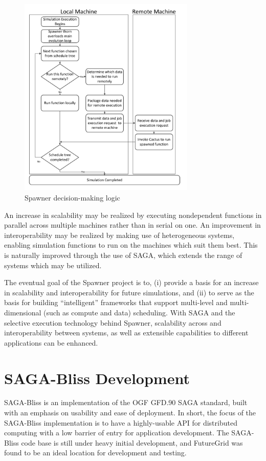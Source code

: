 \documentclass[]{paper}
\begin{document}
\begin{figure}[t]
	\centering
		\includegraphics[width=0.75\textwidth]{figures/spawner-logic.pdf}
\caption{Spawner decision-making logic}
\label{fig:spawner}
\end{figure}		

An increase in scalability may be realized by executing nondependent functions in parallel across multiple machines rather than in serial on one.  An improvement in interoperability may be realized by making use of heterogeneous systems, enabling simulation functions to run on the machines which suit them best.  This is naturally improved through the use of SAGA, which extends the range of systems which may be utilized.

The eventual goal of the Spawner project is to, (i) provide a basis for an increase in scalability and interoperability for future simulations, and (ii) to serve as the basis for building ``intelligent'' frameworks that support multi-level and multi-dimensional (such as compute and data) scheduling.  With SAGA and the selective execution technology behind Spawner, scalability across and interoperability between systems, as well as extensible capabilities to different applications can be enhanced.

\section{SAGA-Bliss Development} SAGA-Bliss is an implementation of the OGF GFD.90 SAGA standard, built with an emphasis on usability and ease of deployment.  %
In short, the focus of the SAGA-Bliss implementation is to have a highly-usable API for distributed computing with a low barrier of entry for application development. The SAGA-Bliss code base is still under heavy initial development, and FutureGrid was found to be an ideal location for development and testing.
\end{document}

